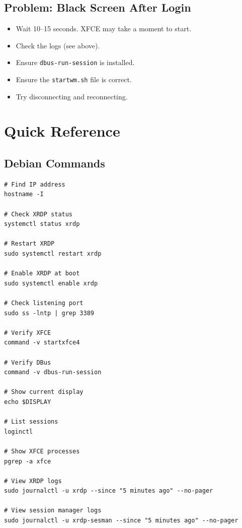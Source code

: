 \documentclass[a4paper,12pt]{article}
\newcommand{\code}[1]{\texttt{\small #1}}
\begin{document}
\subsection{Problem: Black Screen After Login}

\begin{itemize}[leftmargin=2em]
    \item Wait 10--15 seconds. XFCE may take a moment to start.
    \item Check the logs (see above).
    \item Ensure \code{dbus-run-session} is installed.
    \item Ensure the \code{startwm.sh} file is correct.
    \item Try disconnecting and reconnecting.
\end{itemize}

\section{Quick Reference}

\subsection{Debian Commands}

\begin{lstlisting}[style=bashstyle]
# Find IP address
hostname -I

# Check XRDP status
systemctl status xrdp

# Restart XRDP
sudo systemctl restart xrdp

# Enable XRDP at boot
sudo systemctl enable xrdp

# Check listening port
sudo ss -lntp | grep 3389

# Verify XFCE
command -v startxfce4

# Verify DBus
command -v dbus-run-session

# Show current display
echo $DISPLAY

# List sessions
loginctl

# Show XFCE processes
pgrep -a xfce

# View XRDP logs
sudo journalctl -u xrdp --since "5 minutes ago" --no-pager

# View session manager logs
sudo journalctl -u xrdp-sesman --since "5 minutes ago" --no-pager
\end{lstlisting}
\end{document}
